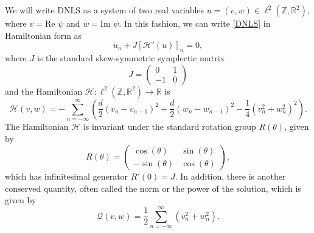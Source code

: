\documentclass[12pt]{elsarticle}
\def\R{{\mathbb R}}
\def\Z{{\mathbb Z}}
\begin{document}
We will write DNLS as a system of two real variables $u = (v, w) \in \ell^2(\Z, \R^2)$, where $v = \text{Re }\psi$ and $w = \text{Im }\psi$. In this fashion, we can write \eqref{DNLS} in Hamiltonian form as
\begin{equation}\label{DNLSrealHam}
\dot{u}_n + J [\mathcal{H}'(u)]_n = 0,
\end{equation}
where $J$ is the standard skew-symmetric symplectic matrix
\[
J = \begin{pmatrix}0 & 1 \\ -1 & 0\end{pmatrix}
\]
and the Hamiltonian $\mathcal{H}: \ell^2(\Z,\R^2) \rightarrow \R$ is
\begin{equation}\label{DNLSrealH}
\mathcal{H}(v, w) = -\sum_{n = -\infty}^\infty 
\left( \frac{d}{2}\left(v_n - v_{n-1}\right)^2 + \frac{d}{2}\left(w_n - w_{n-1}\right)^2 - \frac{1}{4}\left( v_n^2 + w_n^2 \right)^2 \right).
\end{equation}
The Hamiltonian $\mathcal{H}$ is invariant under the standard rotation group $R(\theta)$, given by
\begin{equation}\label{Rtheta}
R(\theta) = \begin{pmatrix}
\cos(\theta) & \sin(\theta) \\
-\sin(\theta)& \cos(\theta)
\end{pmatrix},
\end{equation}
which has infinitesimal generator $R'(0) = J$. In addition, there is another conserved quantity, often called the norm or the power of the solution, which is given by
\begin{equation}\label{DNLSQ}
\mathcal{Q}(v, w) = \frac{1}{2} \sum_{n = -\infty}^\infty 
\left( v_n^2 + w_n ^2\right).
\end{equation}
\end{document}
